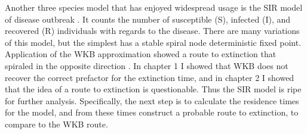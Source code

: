 
Another three species model that has enjoyed widespread usage is the SIR model of disease outbreak \cite{Gadhamsetty2015,Doering2005,Luksza2014}. 
It counts the number of susceptible (S), infected (I), and recovered (R) individuals with regards to the disease. 
There are many variations of this model, but the simplest has a stable spiral node deterministic fixed point. 
Application of the WKB approximation showed a route to extinction that spiraled in the opposite direction \cite{Kamenev2008}. 
In chapter 1 I showed that WKB does not recover the correct prefactor for the extinction time, and in chapter 2 I showed that the idea of a route to extinction is questionable. 
Thus the SIR model is ripe for further analysis. 
Specifically, the next step is to calculate the residence times for the model, and from these times construct a probable route to extinction, to compare to the WKB route. 


